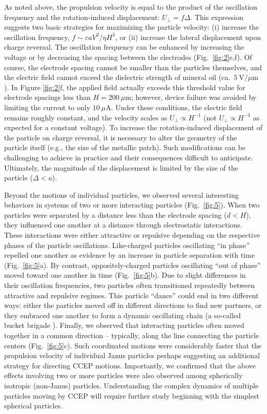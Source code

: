 As noted above, the propulsion velocity is equal to the product of the oscillation frequency and the rotation-induced displacement: $U_{\perp}=f\Delta$.
This expression suggests two basic strategies for maximizing the particle velocity: (i) increase the oscillation frequency, $f\sim\varepsilon a V^2/\eta H^3$, or (ii) increase the lateral displacement upon charge reversal.
The oscillation frequency can be enhanced by increasing the voltage or by decreasing the spacing between the electrodes (Fig.~\ref{fig:2}e,f).
Of course, the electrode spacing cannot be smaller than the particles themselves, and the electric field cannot exceed the dielectric strength of mineral oil (ca.~$5~\text{V/}\mu\text{m}$).
In Figure \ref{fig:2}f, the applied field actually exceeds this threshold value for electrode spacings less than $H=200~\mu\text{m}$; however, device failure was avoided by limiting the current to only $10~\mu\text{A}$.
Under these conditions, the electric field remains roughly constant, and the velocity scales as $U_{\perp}\propto H^{-1}$ (not $U_{\perp}\propto H^{-3}$ as expected for a constant voltage). 
To increase the rotation-induced displacement of the particle on charge reversal, it is necessary to alter the geometry of the particle itself (e.g., the size of the metallic patch). 
Such modifications can be challenging to achieve in practice and their consequences difficult to anticipate. 
Ultimately, the magnitude of the displacement is limited by the size of the particle ($\Delta < a$).

Beyond the motions of individual particles, we observed several interesting  behaviors in systems of two or more interacting particles (Fig.~\ref{fig:5}).
When two particles were separated by a distance less than the electrode spacing ($d<H$), they influenced one another at a distance through electrostatic interactions.
These interactions were either attractive or repulsive depending on the respective phases of the particle oscillations\cite{mersch2011antiphase}.
Like-charged particles oscillating ``in phase'' repelled one another as evidence by an increase in particle separation with time (Fig.~\ref{fig:5}a).
By contrast, oppositely-charged particles oscillating ``out of phase'' moved toward one another in time (Fig.~\ref{fig:5}b).
Due to slight differences in their oscillation frequencies, two particles often transitioned repeatedly between attractive and repulsive regimes.
This particle ``dance'' could end in two different ways: either the particles moved off in different directions to find new partners, or they embraced one another to form a dynamic oscillating chain (a so-called bucket brigade \cite{Pelesko2004a}).
Finally, we observed that interacting particles often moved together in a common direction -- typically, along the line connecting the particle centers (Fig.~\ref{fig:5}c).
Such coordinated motions were considerably faster that the propulsion velocity of individual Janus particles perhaps suggesting an additional strategy for directing CCEP motions.
Importantly, we confirmed that the above effects involving two or more particles were also observed among spherically isotropic (non-Janus) particles.
Understanding the complex dynamics of multiple particles moving by CCEP will require further study beginning with the simplest spherical particles.

